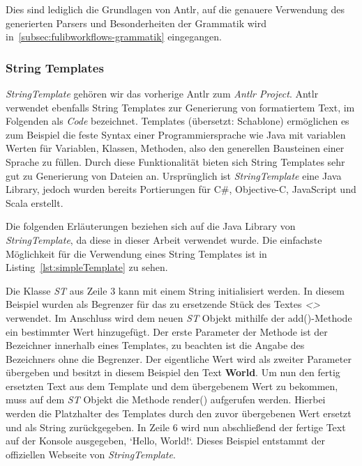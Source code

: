 Dies sind lediglich die Grundlagen von Antlr, auf die genauere Verwendung des generierten Parsers und Besonderheiten der Grammatik wird in~\ref{subsec:fulibworkflows-grammatik} eingegangen.

\subsubsection{String Templates}
\textit{StringTemplate} gehören wir das vorherige Antlr zum \textit{Antlr Project}.
Antlr verwendet ebenfalls String Templates zur Generierung von formatiertem Text, im Folgenden als \textit{Code} bezeichnet.
Templates (übersetzt: Schablone) ermöglichen es zum Beispiel die feste Syntax einer Programmiersprache wie Java mit variablen Werten für
Variablen, Klassen, Methoden, also den generellen Bausteinen einer Sprache zu füllen.
Durch diese Funktionalität bieten sich String Templates sehr gut zu Generierung von Dateien an.
Ursprünglich ist \textit{StringTemplate} eine Java Library, jedoch wurden bereits Portierungen für C#, Objective-C, JavaScript und Scala erstellt.

Die folgenden Erläuterungen beziehen sich auf die Java Library von \textit{StringTemplate}, da diese in dieser Arbeit verwendet wurde.
Die einfachste Möglichkeit für die Verwendung eines String Templates ist in Listing~\ref{lst:simpleTemplate} zu sehen.



Die Klasse \textit{ST} aus Zeile 3 kann mit einem String initialisiert werden.
In diesem Beispiel wurden als Begrenzer für das zu ersetzende Stück des Textes \textit{<>} verwendet.
Im Anschluss wird dem neuen \textit{ST} Objekt mithilfe der add()-Methode ein bestimmter Wert hinzugefügt.
Der erste Parameter der Methode ist der Bezeichner innerhalb eines Templates, zu beachten ist die Angabe des Bezeichners ohne die Begrenzer.
Der eigentliche Wert wird als zweiter Parameter übergeben und besitzt in diesem Beispiel den Text \textbf{World}.
Um nun den fertig ersetzten Text aus dem Template und dem übergebenem Wert zu bekommen, muss auf dem \textit{ST} Objekt die Methode render() aufgerufen werden.
Hierbei werden die Platzhalter des Templates durch den zuvor übergebenen Wert ersetzt und als String zurückgegeben.
In Zeile 6 wird nun abschließend der fertige Text auf der Konsole ausgegeben, `Hello, World!`.
Dieses Beispiel entstammt der offiziellen Webseite von \textit{StringTemplate}.\cite*{stOrg}


